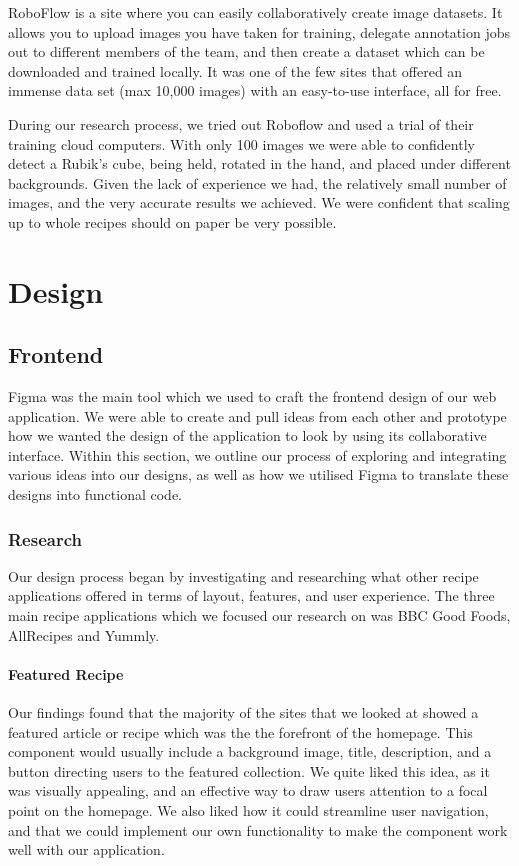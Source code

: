 \documentclass{article}
\begin{document}
RoboFlow \cite{RoboFlow-Software} is a site where you can easily collaboratively create image datasets. It allows you to upload images you have taken for training, delegate annotation jobs out to different members of the team, and then create a dataset which can be downloaded and trained locally. It was one of the few sites that offered an immense data set (max 10,000 images) with an easy-to-use interface, all for free.

During our research process, we tried out Roboflow and used a trial of their training cloud computers. With only 100 images we were able to confidently detect a Rubik's cube, being held, rotated in the hand, and placed under different backgrounds. Given the lack of experience we had, the relatively small number of images, and the very accurate results we achieved. We were confident that scaling up to whole recipes should on paper be very possible.
    
    \section{Design}
    \subsection{Frontend}
    Figma was the main tool which we used to craft the frontend design of our web application. We were able to create and pull ideas from each other and prototype how we wanted the design of the application to look by using its collaborative interface. Within this section, we outline our process of exploring and integrating various ideas into our designs, as well as how we utilised Figma to translate these designs into functional code.

    \subsubsection{Research}
    
    Our design process began by investigating and researching what other recipe applications offered in terms of layout, features, and user experience. The three main recipe applications which we focused our research on was BBC Good Foods, AllRecipes and Yummly. 
    
    \paragraph{Featured Recipe}
    Our findings found that the majority of the sites that we looked at showed a featured article or recipe which was the the forefront of the homepage. This component would usually include a background image, title, description, and a button directing users to the featured collection. We quite liked this idea, as it was visually appealing, and an effective way to draw users attention to a focal point on the homepage. We also liked how it could streamline user navigation, and that we could implement our own functionality to make the component work well with our application.
    
\end{document}

